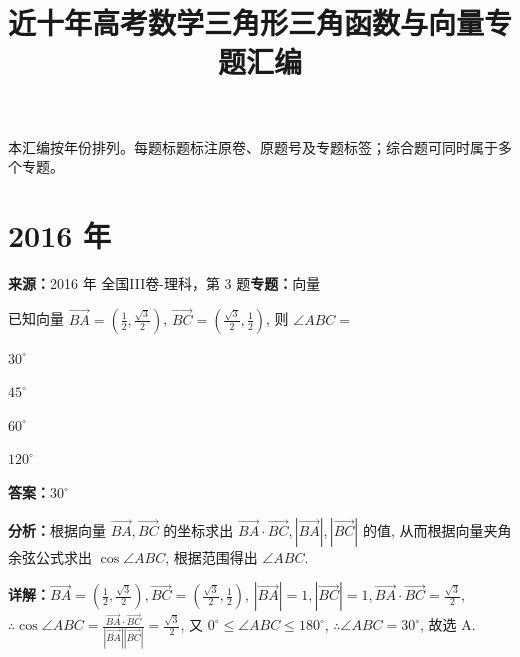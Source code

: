 ﻿\title{近十年高考数学三角形三角函数与向量专题汇编}
\author{}
\date{}
\maketitle
\noindent 本汇编按年份排列。每题标题标注原卷、原题号及专题标签；综合题可同时属于多个专题。

\section*{2016 年}

\begin{question}[points=5]
\textbf{来源：}2016 年 全国III卷-理科，第 3 题\quad \textbf{专题：}向量\par
已知向量 $\overrightarrow{BA}=(\frac{1}{2},\frac{\sqrt{3}}{2})$, $\overrightarrow{BC}=(\frac{\sqrt{3}}{2},\frac{1}{2})$, 则 $\angle ABC=$
\begin{choices}
  \item $30^\circ$
  \item $45^\circ$
  \item $60^\circ$
  \item $120^\circ$
\end{choices}
\begin{solution}
\textbf{答案：}$30^\circ$

\textbf{分析：}根据向量 $\overrightarrow{BA},\overrightarrow{BC}$ 的坐标求出 $\overrightarrow{BA}\cdot\overrightarrow{BC},|\overrightarrow{BA}|,|\overrightarrow{BC}|$ 的值, 从而根据向量夹角余弦公式求出 $\cos\angle ABC$, 根据范围得出 $\angle ABC$.

\textbf{详解：}$\overrightarrow{BA}=(\frac{1}{2},\frac{\sqrt{3}}{2}),\overrightarrow{BC}=(\frac{\sqrt{3}}{2},\frac{1}{2})$, $|\overrightarrow{BA}|=1,|\overrightarrow{BC}|=1,\overrightarrow{BA}\cdot\overrightarrow{BC}=\frac{\sqrt{3}}{2}$, $\therefore \cos\angle ABC=\frac{\overrightarrow{BA}\cdot\overrightarrow{BC}}{|\overrightarrow{BA}||\overrightarrow{BC}|}=\frac{\sqrt{3}}{2}$, 又 $0^\circ\le\angle ABC\le180^\circ$, $\therefore\angle ABC=30^\circ$, 故选 A.
\end{solution}
\end{question}

